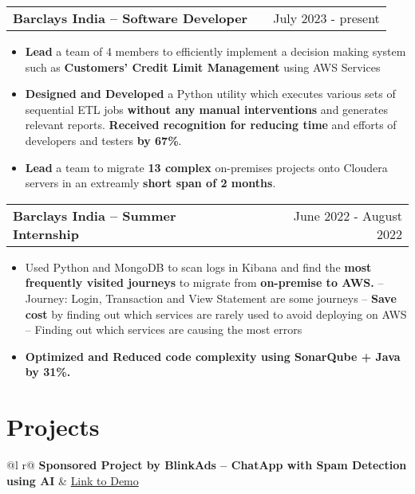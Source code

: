 \documentclass[a4paper,12pt]{article}
\makeatletter
\newenvironment{joblong}[2]
    {
    \begin{tabularx}{\linewidth}{@{}l X r@{}}
    \textbf{#1} & \hfill &  #2 \\[3.75pt]
    \end{tabularx}
    \begin{minipage}[t]{\linewidth}
    \begin{itemize}[nosep,after=\strut, leftmargin=1em, itemsep=3pt,label=--]
    }
    {
    \end{itemize}
    \end{minipage}    
    }
\makeatother
\begin{document}
\begin{joblong}{Barclays India -- Software Developer}{July 2023 - present}
\item \textbf{Lead} a team of 4 members to efficiently implement a decision making system such as \textbf{Customers' Credit Limit Management} using AWS Services   
\item \textbf{Designed and Developed} a Python utility which executes various sets of sequential ETL jobs \textbf{without any manual interventions} and generates relevant reports. \textbf{Received recognition for reducing time} and efforts of developers and testers \textbf{by 67\%}.  
\item \textbf{Lead} a team to migrate \textbf{13 complex} on-premises projects onto Cloudera servers in an extreamly \textbf{short span of 2 months}. 
\end{joblong}

\begin{joblong}{Barclays India -- Summer Internship}{June 2022 - August 2022}
\item Used Python and MongoDB to scan logs in Kibana and find the \textbf{most frequently visited journeys} to migrate from \textbf{on-premise to AWS.}
\subitem -- Journey: Login, Transaction and View Statement are some journeys
\subitem -- \textbf{Save cost} by finding out which services are rarely used to avoid deploying on AWS
\subitem -- Finding out which services are causing the most errors
\item \textbf{Optimized and Reduced code complexity using SonarQube + Java by 31\%.}
\end{joblong}

\section{Projects}

\begin{tabularx}{\linewidth}{ @{}l r@{} }
\textbf{Sponsored Project by BlinkAds -- ChatApp with Spam Detection using AI} & \hfill \href{https://www.youtube.com/watch?v=o5Tk2lKu8jY}{Link to Demo} \\[3.75pt]
  \\
 \\
 \\
\end{tabularx}
\end{document}

